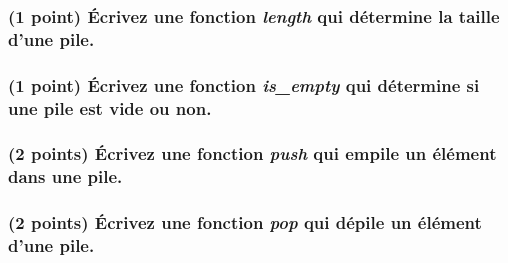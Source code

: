 \documentclass[11pt,a4paper]{article}
\begin{document}
\bigskip

\begin{center}
\end{center}


\begin{center}
\begin{table}[ht!]
  \centering
  \begin{minipage}{0.48\textwidth}

\subsubsection{(1 point) \'Ecrivez une fonction \og \textit{length} \fg{} qui détermine la taille d'une pile. }

\begin{center}
\end{center}

  \end{minipage}
  \hfillx
  \begin{minipage}{0.48\textwidth}

\subsubsection{(1 point) \'Ecrivez une fonction \og \textit{is\_empty} \fg{} qui détermine si une pile est vide ou non. }

\begin{center}
\end{center}

  \end{minipage}
\end{table}
\end{center}


\clearpage


\subsubsection{(2 points) \'Ecrivez une fonction \og \textit{push} \fg{} qui empile un élément dans une pile. }

\begin{center}
\end{center}


\subsubsection{(2 points) \'Ecrivez une fonction \og \textit{pop} \fg{} qui dépile un élément d'une pile. }
\end{document}
